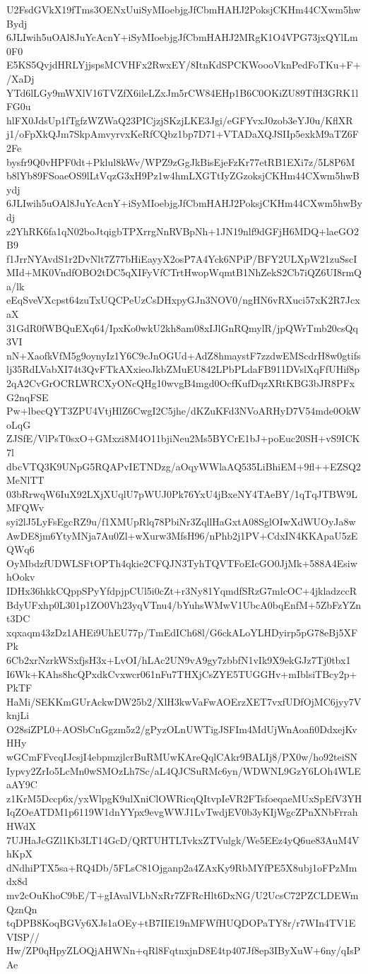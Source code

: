 U2FsdGVkX19fTms3OENxUuiSyMIoebjgJfCbmHAHJ2PoksjCKHm44CXwm5hwBydj
6JLIwih5uOAl8JuYcAcnY+iSyMIoebjgJfCbmHAHJ2MRgK1O4VPG73jxQYlLm0F0
E5KS5QvjdHRLYjjspsMCVHFx2RwxEY/8ItnKdSPCKWoooVknPedFoTKu+F+/XaDj
YTd6lLGy9mWXlV16TVZfX6ileLZxJm5rCW84EHp1B6C0OKiZU89TfH3GRK1lFG0u
hlFX0JdsUp1fTgfzWZWaQ23PICjzjSKzjLKE3Jgi/eGFYvxJ0zob3eYJ0u/KflXR
j1/oFpXkQJm7SkpAmvyrvxKeRfCQbz1bp7D71+VTADaXQJSIIp5exkM9aTZ6F2Fe
bysfr9Q0vHPF0dt+Pklul8kWv/WPZ9zGgJkBisEjeFzKr77etRB1EXi7z/5L8P6M
b8lYb89FSoaeOS9lLtVqzG3xH9Pz1w4hmLXGTtIyZGzoksjCKHm44CXwm5hwBydj
6JLIwih5uOAl8JuYcAcnY+iSyMIoebjgJfCbmHAHJ2PoksjCKHm44CXwm5hwBydj
z2YhRK6fa1qN02boJtqigbTPXrrgNnRVBpNh+1JN19nlf9dGFjH6MDQ+laeGO2B9
f1JrrNYAvdS1r2DvNlt7Z77bHiEayyX2osP7A4Yck6NPiP/BFY2ULXpW21zuSscI
MId+MK0VndfOBO2tDC5qXIFyVfCTrtHwopWqmtB1NhZekS2Cb7iQZ6UI8rmQa/lk
eEqSveVXcpst64zuTxUQCPeUzCsDHxpyGJn3NOV0/ngHN6vRXuci57xK2R7JcxaX
31GdR0fWBQuEXq64/IpxKo0wkU2kh8am08xIJlGnRQmylR/jpQWrTmb20csQq3VI
nN+XaofkVfM5g9oynyIz1Y6C9cJnOGUd+AdZ8hmaystF7zzdwEMScdrH8w0gtifs
lj35RdLVabXI74t3QvFTkAXxieoJkbZMuEU842LPbPLdaFB911DVslXqFfUHif8p
2qA2CvGrOCRLWRCXyONcQHg10wvgB4mgd0OcfKufDqzXRtKBG3bJR8PFxG2nqFSE
Pw+lbecQYT3ZPU4VtjHlZ6CwgI2C5jhe/dKZuKFd3NVoARHyD7V54mde0OkWoLqG
ZJSfE/VlPsT0sxO+GMxzi8M4O11bjiNeu2Ms5BYCrE1bJ+poEuc20SH+vS9ICK7l
dbcVTQ3K9UNpG5RQAPvIETNDzg/aOqyWWlaAQ535LiBhiEM+9fl++EZSQ2MeNlTT
03bRrwqW6IuX92LXjXUqlU7pWUJ0Pk76YxU4jBxeNY4TAeBY/1qTqJTBW9LMFQWv
syi2lJ5LyFsEgcRZ9u/f1XMUpRlq78PbiNr3ZqllHaGxtA08SglOIwXdWUOyJa8w
AwDE8jm6YtyMNja7Au0Zl+wXurw3MfsH96/nPhb2j1PV+CdxIN4KKApaU5zEQWq6
OyMbdzfUDWLSFtOPTh4qkie2CFQJN3TyhTQVTFoEIcGO0JjMk+588A4EsiwhOokv
IDHx36hkkCQppSPyYfdpjpCUl5i0cZt+r3Ny81YqmdfSRzG7mlcOC+4jkladzccR
BdyUFxhp0L301p1ZO0Vh23yqVTnu4/bYuhsWMwV1UbcA0bqEnfM+5ZbFzYZnt3DC
xqxaqm43zDz1AHEi9UhEU77p/TmEdICh68l/G6ckALoYLHDyirp5pG78eBj5XFPk
6Cb2xrNzrkWSxfjsH3x+LvOI/hLAc2UN9vA9gy7zbbfN1vIk9X9ekGJz7Tj0tbx1
I6Wk+KAhs8hcQPxdkCvxwcr061nFu7THXjCsZYE5TUGGHv+mIblsiTBcy2p+PkTF
HaMi/SEKKmGUrAckwDW25b2/XlH3kwVaFwAOErzXET7vxfUDfOjMC6jyy7VknjLi
O28siZPL0+AOSbCnGgzm5z2/gPyzOLnUWTigJSFIm4MdUjWnAoafi0DdxejKvHHy
wGCmFFvcqIJcsjI4ebpmzjlcrBuRMUwKAreQqlCAkr9BALIj8/PX0w/ho92teiSN
Iypvy2ZrIo5LcMn0wSMOzLh7Sc/aL4QJCSuRMc6yn/WDWNL9GzY6LOh4WLEaAY9C
z1KrM5Dccp6x/yxWlpgK9ulXniClOWRicqQItvpIeVR2FTsfoeqaeMUxSpEfV3YH
IqZOeATDM1p6119W1dnYYpx9evgWWJ1LvTwdjEV0b3yKIjWgcZPnXNbFrrahHWdX
7UJHaJcGZl1Kb3LT14GcD/QRTUHTLTvkxZTVulgk/We5EEz4yQ6ue83AuM4VhKpX
dNdhiPTX5sa+RQ4Db/5FLsC81Ojganp2a4ZAxKy9RbMYfPE5X8ubj1oFPzMmdx8d
mv2cOuKhoC9bE/T+gIAvalVLbNxRr7ZFRcHlt6DxNG/U2UcsC72PZCLDEWmQznQn
tqDPB8KoqBGVy6XJs1aOEy+tB7IIE19nMFWfHUQDOPaTY8r/r7WIn4TV1EVISP//
Hw/ZP0qHpyZLOQjAHWNn+qRl8FqtnxjnD8E4tp407Jf8ep3IByXuW+6ny/qIsPAe
